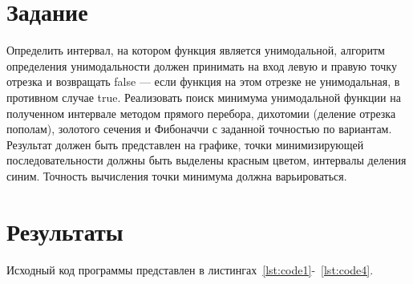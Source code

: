 \documentclass[a4paper, 14pt]{extarticle}
\begin{document}
\renewcommand{\ttdefault}{pcr}

\setlength{\tabcolsep}{3pt}
\newpage
\setcounter{page}{2}

\section{Задание}\label{Sect::task}

Определить интервал, на котором функция является унимодальной, алгоритм 
определения унимодальности должен принимать на вход левую и правую точку 
отрезка и возвращать false — если функция на этом отрезке не унимодальная, в 
противном случае true.  
Реализовать поиск минимума унимодальной функции на полученном 
интервале методом прямого перебора, дихотомии (деление отрезка пополам), 
золотого сечения и Фибоначчи с заданной точностью по вариантам. Результат 
должен быть представлен на графике, точки минимизирующей последовательности должны быть выделены красным цветом, интервалы деления синим. 
Точность вычисления точки минимума должна варьироваться. 

\section{Результаты}\label{Sect::res}

Исходный код программы представлен в листингах~\ref{lst:code1}-~\ref{lst:code4}.
\end{document}
